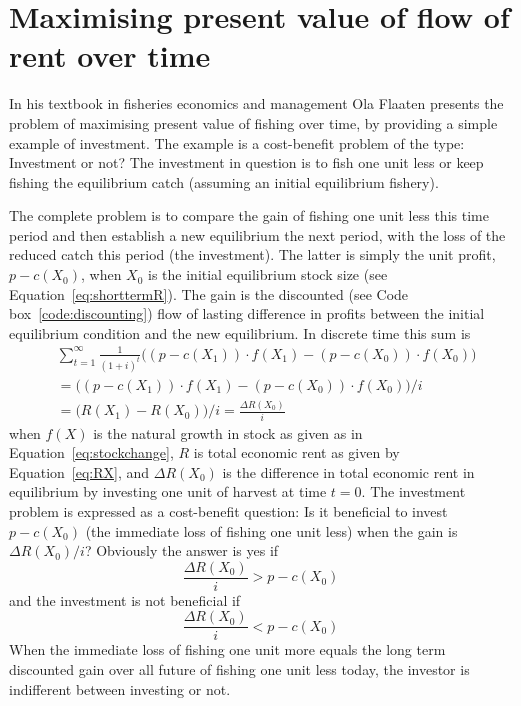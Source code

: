 \documentclass[11pt,fleqn]{book} %
\begin{document}
\section{Maximising present value of flow of rent over time}\label{section:pvmax}

In his textbook in fisheries economics and management Ola Flaaten presents the problem of maximising present value of fishing over time, by providing a simple example of investment\cite{Flaaten2016FisheriesManagement}. The example is a cost-benefit problem of the type: Investment or not? The investment in question is to fish one unit less or keep fishing the equilibrium catch (assuming an initial equilibrium fishery).

The complete problem is to compare the gain of fishing one unit less this time period and then establish a new equilibrium the next period, with the loss of the reduced catch this period (the investment). The latter is simply the unit profit, $p - c(X_0)$, when $X_0$ is the initial equilibrium stock size (see Equation~\ref{eq:shorttermR}). The gain is the discounted (see Code box~\ref{code:discounting}) flow of lasting difference in profits between the initial equilibrium condition and the new equilibrium. In discrete time this sum is
\begin{equation} 
\label{eq:discdiff}
 \begin{aligned} & \displaystyle\sum_{t=1}^{\infty} \frac{1}{(1+i)^t} \bigg( (p-c(X_1)) \cdot f(X_1) - (p-c(X_0)) \cdot f(X_0) \bigg) \\
 & = \bigg( (p-c(X_1)) \cdot f(X_1) - (p-c(X_0)) \cdot f(X_0) \bigg) / i \\
 & = \Big( R(X_1) - R(X_0) \Big) / i = \frac{\Delta R(X_0)}{i}
 \end{aligned}
\end{equation}
when $f(X)$ is the natural growth in stock as given as in Equation~\ref{eq:stockchange}, $R$ is total economic rent as given by Equation~\ref{eq:RX}, and $\Delta R(X_0)$ is the difference in total economic rent in equilibrium by investing one unit of harvest at time $t = 0$. The investment problem is expressed as a cost-benefit question: Is it beneficial to invest $p - c(X_0)$ (the immediate loss of fishing one unit less) when the gain is $\Delta R(X_0)/i$? Obviously the answer is yes if
\begin{equation*} 
 \frac{\Delta R(X_0)}{i} > p - c(X_0)
\end{equation*}
and the investment is not beneficial if
\begin{equation*} 
 \frac{\Delta R(X_0)}{i} < p - c(X_0)
\end{equation*}
When the immediate loss of fishing one unit more equals the long term discounted gain over all future of fishing one unit less today, the investor is indifferent between investing or not.
\end{document}
